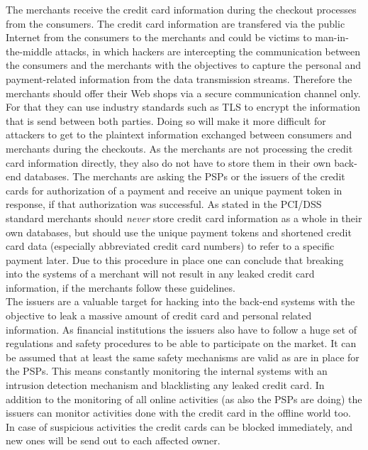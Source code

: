 The merchants receive the credit card information during the checkout processes from the consumers. The credit card information are transfered via the public Internet from the consumers to the merchants and could be victims to man-in-the-middle attacks, in which hackers are intercepting the communication between the consumers and the merchants with the objectives to capture the personal and payment-related information from the data transmission streams. Therefore the merchants should offer their Web shops via a secure communication channel only. For that they can use industry standards such as \gls{TLS} to encrypt the information that is send between both parties. Doing so will make it more difficult for attackers to get to the plaintext information exchanged between consumers and merchants during the checkouts. As the merchants are not processing the credit card information directly, they also do not have to store them in their own back-end databases. The merchants are asking the \gls{PSP}s or the issuers of the credit cards for authorization of a payment and receive an unique payment token in response, if that authorization was successful. As stated in the \gls{PCI/DSS} standard \citep{virtue2009payment} merchants should \emph{never} store credit card information as a whole in their own databases, but should use the unique payment tokens and shortened credit card data (especially abbreviated credit card numbers) to refer to a specific payment later. Due to this procedure in place one can conclude that breaking into the systems of a merchant will not result in any leaked credit card information, if the merchants follow these guidelines. \\

The issuers are a valuable target for hacking into the back-end systems with the objective to leak a massive amount of credit card and personal related information. As financial institutions the issuers also have to follow a huge set of regulations and safety procedures to be able to participate on the market. It can be assumed that at least the same safety mechanisms are valid as are in place for the \gls{PSP}s. This means constantly monitoring the internal systems with an intrusion detection mechanism and blacklisting any leaked credit card. In addition to the monitoring of all online activities (as also the \gls{PSP}s are doing) the issuers can monitor activities done with the credit card in the offline world too. In case of suspicious activities the credit cards can be blocked immediately, and new ones will be send out to each affected owner. \\

